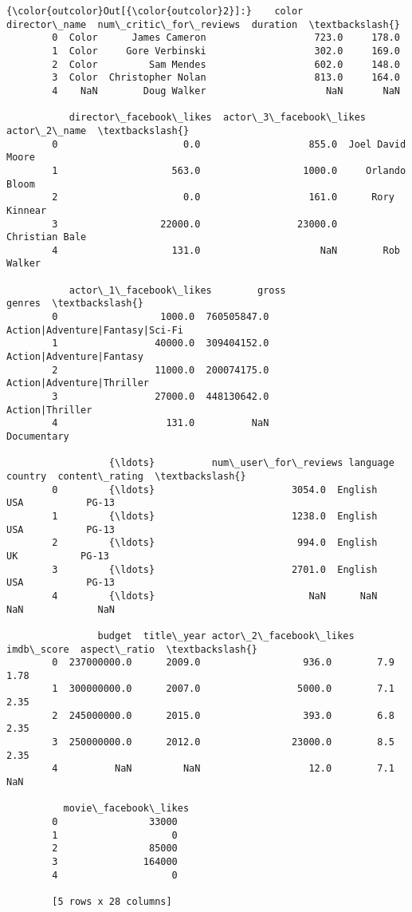 \documentclass[11pt]{article}
\begin{document}
\begin{Verbatim}[commandchars=\\\{\}]
{\color{outcolor}Out[{\color{outcolor}2}]:}    color      director\_name  num\_critic\_for\_reviews  duration  \textbackslash{}
        0  Color      James Cameron                   723.0     178.0   
        1  Color     Gore Verbinski                   302.0     169.0   
        2  Color         Sam Mendes                   602.0     148.0   
        3  Color  Christopher Nolan                   813.0     164.0   
        4    NaN        Doug Walker                     NaN       NaN   
        
           director\_facebook\_likes  actor\_3\_facebook\_likes      actor\_2\_name  \textbackslash{}
        0                      0.0                   855.0  Joel David Moore   
        1                    563.0                  1000.0     Orlando Bloom   
        2                      0.0                   161.0      Rory Kinnear   
        3                  22000.0                 23000.0    Christian Bale   
        4                    131.0                     NaN        Rob Walker   
        
           actor\_1\_facebook\_likes        gross                           genres  \textbackslash{}
        0                  1000.0  760505847.0  Action|Adventure|Fantasy|Sci-Fi   
        1                 40000.0  309404152.0         Action|Adventure|Fantasy   
        2                 11000.0  200074175.0        Action|Adventure|Thriller   
        3                 27000.0  448130642.0                  Action|Thriller   
        4                   131.0          NaN                      Documentary   
        
                  {\ldots}          num\_user\_for\_reviews language  country  content\_rating  \textbackslash{}
        0         {\ldots}                        3054.0  English      USA           PG-13   
        1         {\ldots}                        1238.0  English      USA           PG-13   
        2         {\ldots}                         994.0  English       UK           PG-13   
        3         {\ldots}                        2701.0  English      USA           PG-13   
        4         {\ldots}                           NaN      NaN      NaN             NaN   
        
                budget  title\_year actor\_2\_facebook\_likes imdb\_score  aspect\_ratio  \textbackslash{}
        0  237000000.0      2009.0                  936.0        7.9          1.78   
        1  300000000.0      2007.0                 5000.0        7.1          2.35   
        2  245000000.0      2015.0                  393.0        6.8          2.35   
        3  250000000.0      2012.0                23000.0        8.5          2.35   
        4          NaN         NaN                   12.0        7.1           NaN   
        
          movie\_facebook\_likes  
        0                33000  
        1                    0  
        2                85000  
        3               164000  
        4                    0  
        
        [5 rows x 28 columns]
\end{Verbatim}
            
\end{document}
